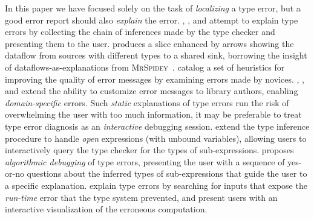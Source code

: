 In this paper we have focused solely on the task of \emph{localizing} a
type error, but a good error report should also \emph{explain} the
error.
%
\citet{Wand1986-nw}, \citet{Beaven1993-hb}, and \citet{Duggan1996-by}
attempt to explain type errors by collecting the chain of inferences
made by the type checker %
and presenting them to the user.
%
%
\citet{Gast2004-zd} produces a slice enhanced by arrows
showing the dataflow from sources with different types to a
shared sink, borrowing the insight of dataflows-as-explanations from
\textsc{MrSpidey}~\citep{Flanagan1996-bu}.
%
\citet{Hage2006-hc} catalog a set of heuristics for
improving the quality of error messages by examining errors made by
novices.
%
\citet{Heeren2003-db}, \citet{Christiansen2014-qc}, and
\citet{Serrano2016-oo} extend the ability to customize error messages to
library authors, enabling \emph{domain-specific} errors.
%
Such \emph{static} explanations of type errors run the risk of
overwhelming the user with too much information, it may be preferable to
treat type error diagnosis as an \emph{interactive} debugging session.
%
\citet{Bernstein1995-yj} extend the type inference procedure to handle
\emph{open} expressions (\ie with unbound variables), allowing users to
interactively query the type checker for the types of sub-expressions.
%
\citet{Chitil2001-td} proposes \emph{algorithmic debugging} of type
errors, presenting the user with a sequence of yes-or-no questions about
the inferred types of sub-expressions that guide the user to a specific
explanation.
%
\citet{Seidel2016-ul} explain type errors by searching for inputs that
expose the \emph{run-time} error that the type system prevented, and
present users with an interactive visualization of the erroneous
computation.

%


